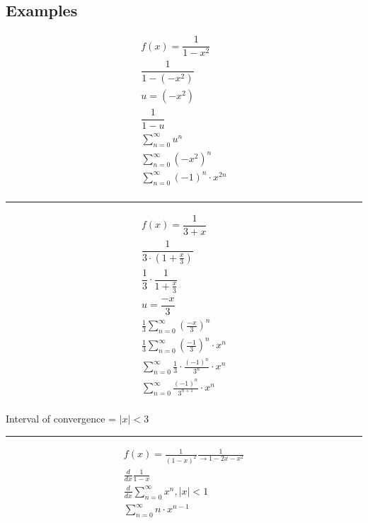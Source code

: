 \documentclass{article}
\begin{document}
\subsection*{Examples}
\begin{equation}
\begin{aligned}
f(x)=\dfrac{1}{1-x^2}\\
\dfrac{1}{1-(-x^2)}\\
u=(-x^2)\\
\dfrac{1}{1-u}\\
\displaystyle \sum^\infty_{n=0}u^n\\
\displaystyle \sum^\infty_{n=0}(-x^2)^n\\
\displaystyle \sum^\infty_{n=0}(-1)^n \cdot x^{2n}\\
\end{aligned}
\end{equation}
\hrule
\begin{equation}
\begin{aligned}
f(x)=\dfrac{1}{3+x}\\
\dfrac{1}{3\cdot (1+\frac{x}{3})}\\
\dfrac{1}{3} \cdot \dfrac{1}{1+\frac{x}{3} }\\
u=\dfrac{-x}{3}\\
\displaystyle \frac{1}{3}\sum^\infty_{n=0}\left(\frac{-x}{3}\right)^n\\
\displaystyle \frac{1}{3}\sum^\infty_{n=0}\left(\frac{-1}{3}\right)^n \cdot x^n\\
\displaystyle\sum^\infty_{n=0} \frac{1}{3} \cdot \frac{(-1)^n}{3^n} \cdot x^n\\
\displaystyle \sum^\infty_{n=0}\frac{(-1)^n}{3^{n+1} } \cdot x^n\\
\end{aligned}
\end{equation}
\begin{center}
Interval of convergence = $|x|<3$
\end{center}
\hrule
\begin{equation}
\begin{aligned}
f(x)=\frac{1}{(1-x)^2}\frac{1}{\rightarrow 1-2x-x^2}\\
\frac{d}{dx}\frac{1}{1-x}\\
\frac{d}{dx}\displaystyle\sum^\infty_{n=0}x^n,|x|<1\\
\sum^\infty_{n=0}n \cdot x^{n-1}
\end{aligned}
\end{equation}
\end{document}
